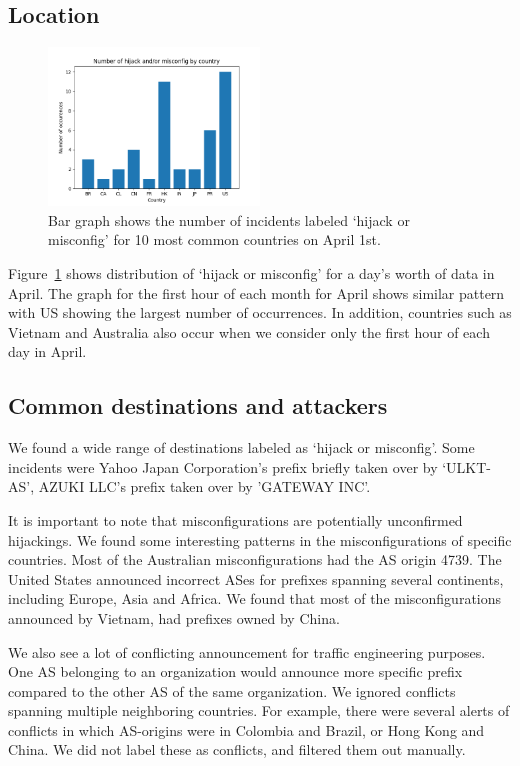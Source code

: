 \subsection{Location}
 \begin{figure}
	\includegraphics[width=0.5\textwidth]{Occurences_by_country_2.png}
	\caption{Bar graph shows the number of incidents labeled `hijack or misconfig' for 10 most common countries on April 1st.}
	\label{fig:conflict_country}
\end{figure}
Figure~\ref{fig:conflict_country} shows distribution of `hijack or misconfig' for a day's worth of data in April. The graph for the first hour of each month for April shows similar pattern with US showing the largest number of occurrences. In addition, countries such as Vietnam and Australia also occur when we consider only the first hour of each day in April. 
\subsection{Common destinations and attackers}
We found  a wide range of destinations labeled as `hijack or misconfig'. Some incidents were Yahoo Japan Corporation's prefix briefly taken over by `ULKT-AS',  AZUKI LLC's prefix taken over by 'GATEWAY INC'. 

It is important to note that misconfigurations are potentially unconfirmed hijackings. We found some interesting patterns in the misconfigurations of specific countries. Most of the Australian misconfigurations had the AS origin 4739. The United States announced incorrect ASes for prefixes spanning several continents, including Europe, Asia and Africa. We found that most of the misconfigurations announced by Vietnam, had prefixes owned by China. 

We also see a lot of conflicting announcement for traffic engineering purposes. One AS belonging to an organization would announce more specific prefix compared to the other AS of the same organization. We ignored conflicts spanning multiple neighboring countries. For example, there were several alerts of conflicts in which AS-origins were in Colombia and Brazil, or Hong Kong and China. We did not label these as conflicts, and filtered them out manually.

